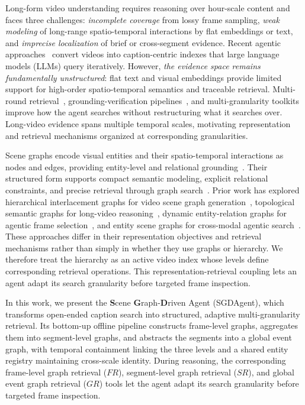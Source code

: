 \documentclass[letterpaper]{article} %
\begin{document}

Long-form video understanding requires reasoning over hour-scale content and faces three challenges: \emph{incomplete coverage} from lossy frame sampling, \emph{weak modeling} of long-range spatio-temporal interactions by flat embeddings or text, and \emph{imprecise localization} of brief or cross-segment evidence.
Recent agentic approaches~\cite{deepvideo2025,videoagent,drvideo2025} convert videos into caption-centric indexes that large language models (LLMs) query iteratively.
However, \emph{the evidence space remains fundamentally unstructured}: flat text and visual embeddings provide limited support for high-order spatio-temporal semantics and traceable retrieval.
Multi-round retrieval~\cite{videoagent}, grounding-verification pipelines~\cite{videomind}, and multi-granularity toolkits~\cite{videoseek} improve how the agent searches without restructuring what it searches over.
Long-video evidence spans multiple temporal scales, motivating representation and retrieval mechanisms organized at corresponding granularities.


Scene graphs encode visual entities and their spatio-temporal interactions as nodes and edges, providing entity-level and relational grounding~\cite{scenegraph1,tpt2023}.
Their structured form supports compact semantic modeling, explicit relational constraints, and precise retrieval through graph search~\cite{scenegraph1,scenegraph2,qiu2025step}.
Prior work has explored hierarchical interlacement graphs for video scene graph generation~\cite{hig2024}, topological semantic graphs for long-video reasoning~\cite{videomindpalace2025}, dynamic entity-relation graphs for agentic frame selection~\cite{graphvideoagent2025}, and entity scene graphs for cross-modal agentic search~\cite{egagent2026}.
These approaches differ in their representation objectives and retrieval mechanisms rather than simply in whether they use graphs or hierarchy.
We therefore treat the hierarchy as an active video index whose levels define corresponding retrieval operations.
This representation-retrieval coupling lets an agent adapt its search granularity before targeted frame inspection.


In this work, we present the \textbf{S}cene \textbf{G}raph-\textbf{D}riven Agent (SGDAgent), which transforms open-ended caption search into structured, adaptive multi-granularity retrieval.
Its bottom-up offline pipeline constructs frame-level graphs, aggregates them into segment-level graphs, and abstracts the segments into a global event graph, with temporal containment linking the three levels and a shared entity registry maintaining cross-scale identity.
During reasoning, the corresponding frame-level graph retrieval ($FR$), segment-level graph retrieval ($SR$), and global event graph retrieval ($GR$) tools let the agent adapt its search granularity before targeted frame inspection.
\end{document}
